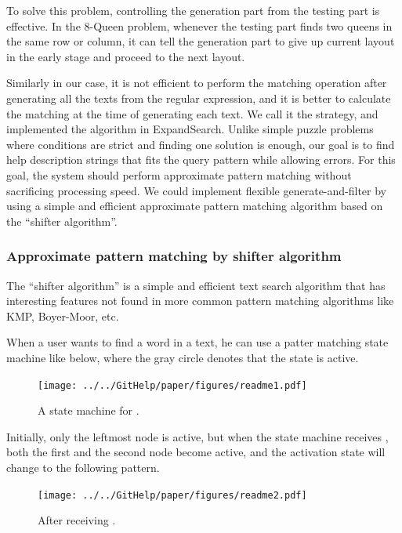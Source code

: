 \documentclass[manuscript,anonymous,review]{acmart}
\def\ES{\textsf{ExpandSearch}}
\begin{document}
To solve this problem,
controlling the generation part from the testing part is effective.
In the 8-Queen problem,
whenever the testing part finds two queens in the same row or column,
it can tell the generation part to
give up current layout in the early stage and proceed to the next layout.

Similarly in our case,
it is not efficient to perform the matching operation
after generating all the texts from the regular expression,
and it is better to calculate the matching
at the time of generating each text.
We call it the  strategy,
and implemented the algorithm in {\ES}.
Unlike simple puzzle problems where
conditions are strict and finding one solution is enough,
our goal is to find help description strings
that fits the query pattern while allowing errors.
For this goal,
the system should perform approximate pattern matching
without sacrificing processing speed.
%
We could implement flexible generate-and-filter by using a simple and efficient
approximate pattern matching algorithm based on the ``shifter algorithm''.

\subsubsection{Approximate pattern matching by shifter algorithm}

The ``shifter algorithm''\cite{Wu:1992:FTS:135239.135244}
is a simple and efficient
text search algorithm that has interesting features
not found in more common pattern matching algorithms like
KMP\cite{KMP}, Boyer-Moor\cite{Boyer:1977:FSS:359842.359859}, etc.

When a user wants to find a word  in a text,
he can use a patter matching state machine like below,
where the gray circle denotes that the state is active.

\begin{figure}[h]
  \centerline{\texttt{[image: ../../GitHelp/paper/figures/readme1.pdf]}}
  \caption{A state machine for .}
  \label{readme1}
\end{figure}

Initially, only the leftmost node is active, but when the
state machine receives , both the first and the second node become active,
and the activation state will change to the following pattern.

\begin{figure}[h]
  \centerline{\texttt{[image: ../../GitHelp/paper/figures/readme2.pdf]}}
  \caption{After receiving .}
  \label{readme2}
\end{figure}
\end{document}
